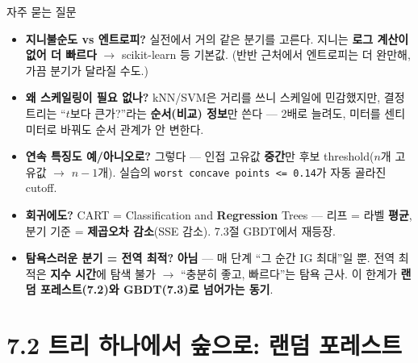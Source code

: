 \documentclass[aspectratio=169,11pt]{beamer}
\begin{document}
\begin{frame}{자주 묻는 질문}
  \small
  \begin{itemize}
    \item \textbf{지니불순도 vs 엔트로피?} 실전에서 거의 같은 분기를 고른다.
      지니는 \textbf{로그 계산이 없어 더 빠르다} $\to$ scikit-learn 등
      기본값. (반반 근처에서 엔트로피는 더 완만해, 가끔 분기가 달라질
      수도.)
    \item \textbf{왜 스케일링이 필요 없나?} kNN/SVM은 거리를 쓰니
      스케일에 민감했지만, 결정 트리는 ``$t$보다 큰가?''라는
      \textbf{순서(비교) 정보}만 쓴다 — 2배로 늘려도, 미터를 센티미터로
      바꿔도 순서 관계가 안 변한다.
    \item \textbf{연속 특징도 예/아니오로?} 그렇다 — 인접 고유값 \textbf{중간}만
      후보 threshold($n$개 고유값 $\to$ $n-1$개). 실습의
      \texttt{worst concave points <= 0.14}가 자동 골라진 cutoff.
    \item \textbf{회귀에도?} CART = Classification and \textbf{Regression}
      Trees — 리프 = 라벨 \textbf{평균}, 분기 기준 = \textbf{제곱오차
      감소}(SSE 감소). 7.3절 GBDT에서 재등장.
    \item \textbf{탐욕스러운 분기 = 전역 최적?} \textbf{아님} — 매 단계
      ``그 순간 IG 최대''일 뿐. 전역 최적은 \textbf{지수 시간}에 탐색
      불가 $\to$ ``충분히 좋고, 빠르다''는 탐욕 근사. 이 한계가
      \textbf{랜덤 포레스트(7.2)와 GBDT(7.3)로 넘어가는 동기}.
  \end{itemize}
\end{frame}

\section{7.2 트리 하나에서 숲으로: 랜덤 포레스트}

\end{document}
